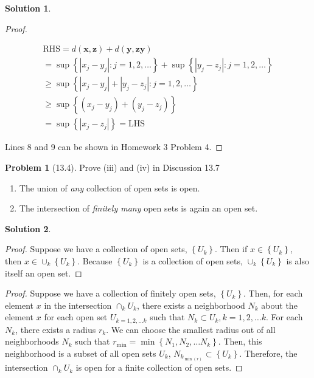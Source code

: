 \documentclass[12pt]{article}
\theoremstyle{definition} %
\newtheorem{solution}{Solution}
\newtheorem{problem}{Problem}
\theoremstyle{plain} %
\begin{document}
\begin{solution}
\begin{proof}
\begin{enumerate}
   \begin{align}
\text{RHS} = d(\mathbf{x}, \mathbf{z})+d(\mathbf{y}, \mathbf{zy})\\[10pt] 
= \sup\left\{ \left\vert x_{j}-y_{j} \right\vert : j=1,2, \ldots   \right\}+ \sup\left\{ \left\vert y_{j}-z_{j} \right\vert : j=1,2, \ldots   \right\} \\[10pt] 
\geq  \sup\left\{ \left\vert x_{j}-y_{j} \right\vert +\left\vert y_{j} -z_{j}  \right\vert : j=1,2, \ldots   \right\}\\[10pt] 
\geq \sup \left\{ (x_{j} -y_{j} )+(y_{j} -z_{j} ) \right\} \\[10pt] 
=\sup \left\{ \left\vert x_{j} -z_{j} \right\vert   \right\} =\text{LHS} 
   \end{align}
\end{enumerate} 
Lines 8 and 9 can be shown in Homework 3 Problem 4.
\end{proof}
\end{solution}

\begin{problem}[13.4]
    Prove (iii) and (iv) in Discussion 13.7
    \begin{enumerate}
        \item The union of \emph{any} collection of open sets is open.
        \item The intersection of \emph{finitely many} open sets is again an open set.
    \end{enumerate}
\end{problem}

\begin{solution}
    \item \begin{proof}
        Suppose we have a collection of open sets, \(\left\{ U_k\right\} \). Then if \(x\in \left\{ U_k\right\} \), then \(x\in \cup_k \left\{ U_k \right\} \). Because \(\left\{ U_k \right\} \) is a collection of open sets, \(\cup_k \left\{ U_k \right\} \) is also itself an open set. 
    \end{proof}
    \item \begin{proof}
        Suppose we have a collection of finitely open sets, \(\left\{ U_k \right\}\). Then, for each element \(x\) in the intersection \(\cap_k U_k\), there exists a neighborhood \(N_k\) about the element \(x\) for each open set \(U_{ k=1,2, \ldots  k}  \) such that \(N_k\subset U_k, k=1,2, \ldots  k \). For each \(N_k\), there exists a radius \(r_k\). We can choose the smallest radius out of all neighborhoods \(N_k\) such that \(r_{\mathop{\min}}=\mathop{\min} \left\{ N_1,N_{2}, \ldots  N_k   \right\} \). Then, this neighborhood is a subset of all open sets \(U_k\), \(N_{k_{\mathop{\min}(r) } }\subset \left\{U_k \right\} \).  Therefore, the intersection \(\cap_k U_k\) is open for a finite collection of open sets.     
    \end{proof}
\end{solution}
\end{document}
